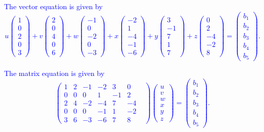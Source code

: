 \documentclass[a4paper,11pt]{article}
\newcommand{\BB}[1]{\textcolor{blue}{#1}}
\begin{document}
\BB{ The vector equation is given by
  \[
    u\begin{pmatrix}1\\0\\2\\0\\3\end{pmatrix}+
    v\begin{pmatrix}2\\0\\4\\0\\6\end{pmatrix}+
    w\begin{pmatrix}-1\\0\\-2\\0\\-3\end{pmatrix}+
    x\begin{pmatrix}-2\\1\\-4\\-1\\-6\end{pmatrix}+
    y\begin{pmatrix}3\\-1\\7\\1\\7\end{pmatrix}+
    z\begin{pmatrix}0\\2\\-4\\-2\\8\end{pmatrix}=
    \begin{pmatrix}b_1\\b_2\\b_3\\b_4\\b_5\end{pmatrix}.
  \]
}

\BB{ The matrix equation is given by
  \[
    \begin{pmatrix}
      1 & 2 & -1 & -2 & 3 & 0 \\
      0 & 0 & 0 & 1 & -1 & 2 & \\
      2 & 4 & -2 & -4 & 7 & -4 \\
      0 & 0 & 0 & -1 & 1 & -2 \\
      3 & 6 & -3 & -6 & 7 & 8 
    \end{pmatrix}
    \begin{pmatrix}u\\v\\w\\x\\y\\z\end{pmatrix}
    =
    \begin{pmatrix}b_1\\b_2\\b_3\\b_4\\b_5\end{pmatrix}.
  \]
}
\end{document}
